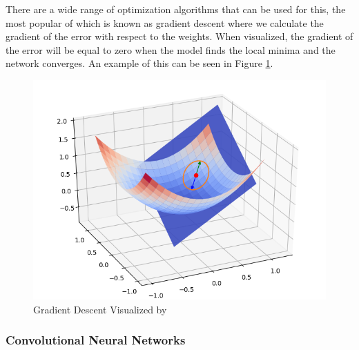 There are a wide range of optimization algorithms that can be used for this, the most popular of which is known as gradient descent \citep{walia_2017} where we calculate the gradient of the error with respect to the weights. When visualized, the gradient of the error will be equal to zero when the model finds the local minima and the network converges. An example of this can be seen in Figure \ref{grade}.

\begin{figure}[ht]
	\begin{center}
		\advance\leftskip-3cm
		\advance\rightskip-3cm
		\includegraphics[keepaspectratio=true,scale=0.8]{__resources/design/gd.png}
		\caption{Gradient Descent Visualized by \cite{vigier_2017}}
		\label{grade}
	\end{center}
\end{figure}

\subsubsection{Convolutional Neural Networks}

